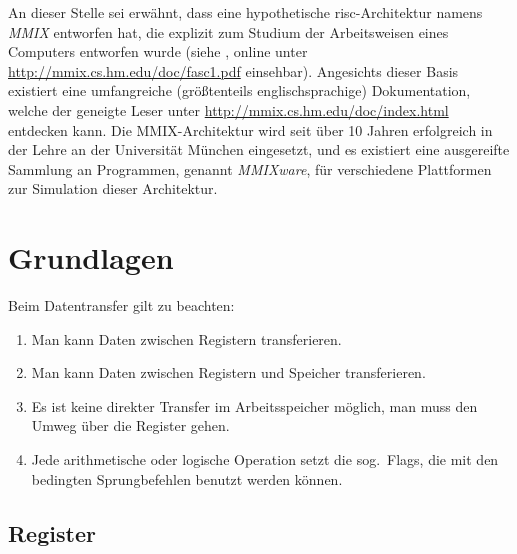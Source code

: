 An dieser Stelle sei erwähnt, dass  eine hypothetische \gls{risc}-Architektur namens \emph{MMIX} entworfen hat, die explizit zum Studium der Arbeitsweisen eines Computers entworfen wurde (siehe \cite{KnuthMMIX}, online unter \url{http://mmix.cs.hm.edu/doc/fasc1.pdf} einsehbar).
Angesichts dieser Basis existiert eine umfangreiche (größtenteils englischsprachige) Dokumentation, welche der geneigte Leser unter \url{http://mmix.cs.hm.edu/doc/index.html} entdecken kann.
Die MMIX-Architektur wird seit über 10 Jahren erfolgreich in der Lehre an der Universität München eingesetzt, und es existiert eine ausgereifte Sammlung an Programmen, genannt \emph{MMIXware}, für verschiedene Plattformen zur Simulation dieser Architektur.


\section{Grundlagen}

Beim Datentransfer gilt zu beachten:
\begin{enumerate}
  \item Man kann Daten zwischen Registern transferieren.
  \item Man kann Daten zwischen Registern und Speicher transferieren.
  \item Es ist keine direkter Transfer im Arbeitsspeicher möglich, man muss den Umweg über die Register gehen.
  \item Jede arithmetische oder logische Operation setzt die sog.~Flags, die mit den bedingten Sprungbefehlen benutzt werden können.
\end{enumerate}

\subsection{Register}

